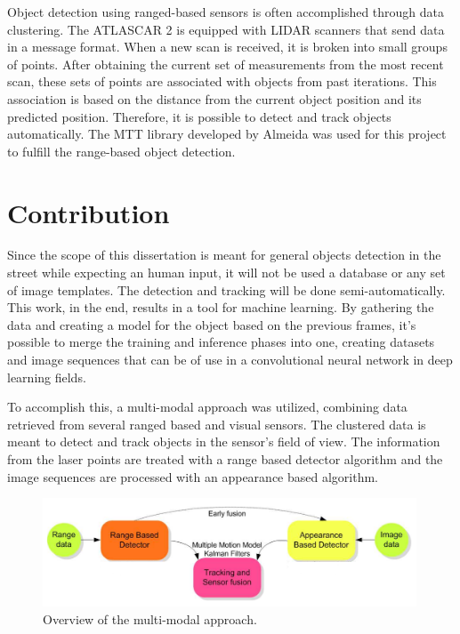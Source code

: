 Object detection using ranged-based sensors is often accomplished through data clustering. The ATLASCAR 2 is equipped with LIDAR scanners that send data in a message format. When a new scan is received, it is broken into small groups of points. After obtaining the current set of measurements from the most recent scan, these sets of points are associated with objects from past iterations. This association is based on the distance from the current object position and its predicted position. Therefore, it is possible to detect and track objects automatically. The MTT library developed by Almeida \cite{SoaresDeAlmeida} was used for this project to fulfill the range-based object detection.


\section{Contribution}

Since the scope of this dissertation is meant for general objects detection in the street while expecting an human input, it will not be used a database or any set of image templates. The detection and tracking will be done semi-automatically. This work, in the end, results in a tool for machine learning. By gathering the data and creating a model for the object based on the previous frames, it's possible to merge the training and inference phases into one, creating datasets and image sequences that can be of use in a convolutional neural network in deep learning fields. 

To accomplish this, a multi-modal approach was utilized, combining data retrieved from several ranged based and visual sensors. The clustered data is meant to detect and track objects in the sensor's field of view. The information from the laser points are treated with a range based detector algorithm and the image sequences are processed with an appearance based algorithm. \cite{Spinello2010}

\begin{figure}[htp]
	
	\centering
	\includegraphics[width=0.99\textwidth]{capstate/imgs/multimodal.png}
	
	\caption{ Overview of the multi-modal approach. }
	\label{fig:basket}
	
\end{figure}

